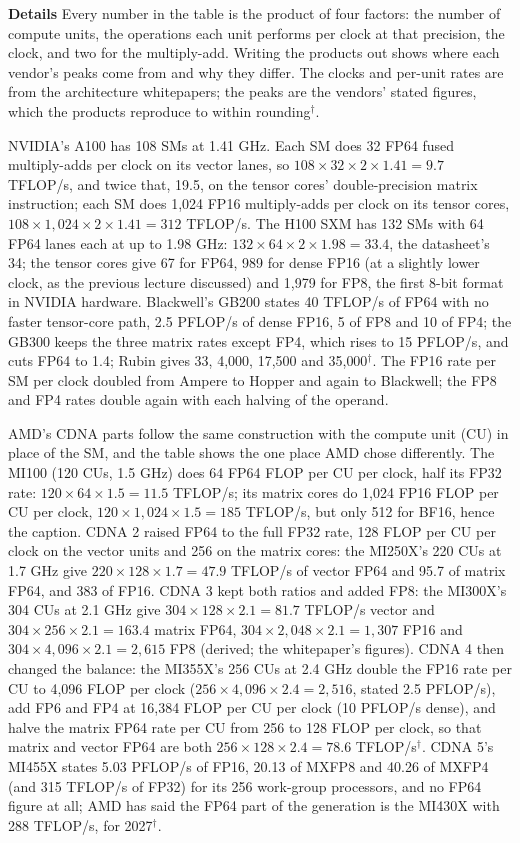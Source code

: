 \documentclass[11pt,letterpaper]{article}
\newcommand{\para}[1]{\medskip\noindent\textbf{#1}\quad}
\begin{document}
\para{Details} Every number in the table is the product of four factors: the number of compute units, the operations each unit performs per clock at that precision, the clock, and two for the multiply-add. Writing the products out shows where each vendor's peaks come from and why they differ. The clocks and per-unit rates are from the architecture whitepapers; the peaks are the vendors' stated figures, which the products reproduce to within rounding$^\dagger$.

NVIDIA's A100 has 108 SMs at 1.41 GHz. Each SM does 32 FP64 fused multiply-adds per clock on its vector lanes, so $108\times32\times2\times1.41=9.7$ TFLOP/s, and twice that, 19.5, on the tensor cores' double-precision matrix instruction; each SM does 1{,}024 FP16 multiply-adds per clock on its tensor cores, $108\times1{,}024\times2\times1.41=312$ TFLOP/s. The H100 SXM has 132 SMs with 64 FP64 lanes each at up to 1.98 GHz: $132\times64\times2\times1.98=33.4$, the datasheet's 34; the tensor cores give 67 for FP64, 989 for dense FP16 (at a slightly lower clock, as the previous lecture discussed) and 1{,}979 for FP8, the first 8-bit format in NVIDIA hardware. Blackwell's GB200 states 40 TFLOP/s of FP64 with no faster tensor-core path, 2.5 PFLOP/s of dense FP16, 5 of FP8 and 10 of FP4; the GB300 keeps the three matrix rates except FP4, which rises to 15 PFLOP/s, and cuts FP64 to 1.4; Rubin gives 33, 4{,}000, 17{,}500 and 35{,}000$^\dagger$. The FP16 rate per SM per clock doubled from Ampere to Hopper and again to Blackwell; the FP8 and FP4 rates double again with each halving of the operand.

AMD's CDNA parts follow the same construction with the compute unit (CU) in place of the SM, and the table shows the one place AMD chose differently. The MI100 (120 CUs, 1.5 GHz) does 64 FP64 FLOP per CU per clock, half its FP32 rate: $120\times64\times1.5=11.5$ TFLOP/s; its matrix cores do 1{,}024 FP16 FLOP per CU per clock, $120\times1{,}024\times1.5=185$ TFLOP/s, but only 512 for BF16, hence the caption. CDNA 2 raised FP64 to the full FP32 rate, 128 FLOP per CU per clock on the vector units and 256 on the matrix cores: the MI250X's 220 CUs at 1.7 GHz give $220\times128\times1.7=47.9$ TFLOP/s of vector FP64 and 95.7 of matrix FP64, and 383 of FP16. CDNA 3 kept both ratios and added FP8: the MI300X's 304 CUs at 2.1 GHz give $304\times128\times2.1=81.7$ TFLOP/s vector and $304\times256\times2.1=163.4$ matrix FP64, $304\times2{,}048\times2.1=1{,}307$ FP16 and $304\times4{,}096\times2.1=2{,}615$ FP8 (derived; the whitepaper's figures). CDNA 4 then changed the balance: the MI355X's 256 CUs at 2.4 GHz double the FP16 rate per CU to 4{,}096 FLOP per clock ($256\times4{,}096\times2.4=2{,}516$, stated 2.5 PFLOP/s), add FP6 and FP4 at 16{,}384 FLOP per CU per clock (10 PFLOP/s dense), and halve the matrix FP64 rate per CU from 256 to 128 FLOP per clock, so that matrix and vector FP64 are both $256\times128\times2.4=78.6$ TFLOP/s$^\dagger$. CDNA 5's MI455X states 5.03 PFLOP/s of FP16, 20.13 of MXFP8 and 40.26 of MXFP4 (and 315 TFLOP/s of FP32) for its 256 work-group processors, and no FP64 figure at all; AMD has said the FP64 part of the generation is the MI430X with 288 TFLOP/s, for 2027$^\dagger$.
\end{document}

